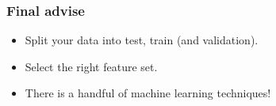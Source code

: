 \documentclass{beamer}\usepackage[]{graphicx}\usepackage[]{color}
\begin{document}


\begin{frame}[fragile] \frametitle{Final advise}

\begin{itemize}
\item Split your data into test, train (and validation).
\item Select the right feature set.
\item There is a handful of machine learning techniques!
\end{itemize}
\end{frame}
\end{document}
